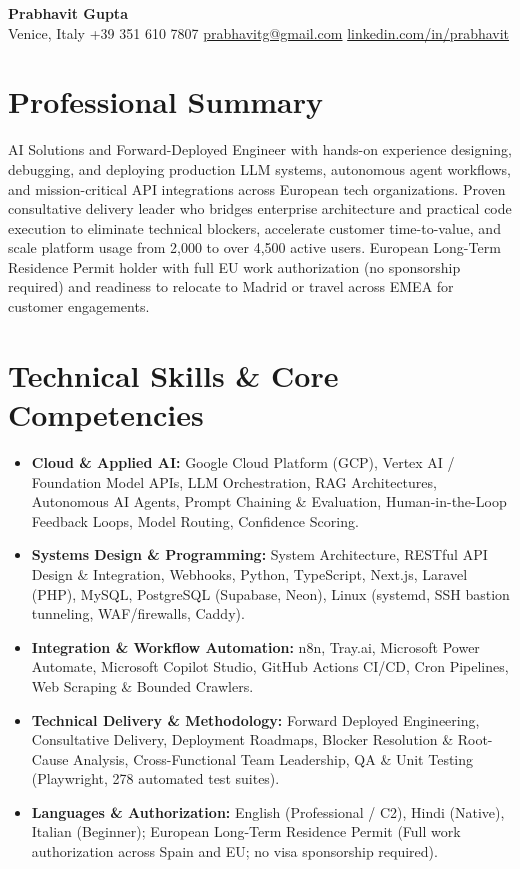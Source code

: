 \documentclass[10pt,a4paper]{article}
\begin{document}

\begin{center}
    {\LARGE \textbf{Prabhavit Gupta}}\\[4pt]
    Venice, Italy \textbar{} +39 351 610 7807 \textbar{} \href{mailto:prabhavitg@gmail.com}{prabhavitg@gmail.com} \textbar{} \href{https://www.linkedin.com/in/prabhavit}{linkedin.com/in/prabhavit}
\end{center}

\vspace{-2pt}

\section*{Professional Summary}
AI Solutions and Forward-Deployed Engineer with hands-on experience designing, debugging, and deploying production LLM systems, autonomous agent workflows, and mission-critical API integrations across European tech organizations. Proven consultative delivery leader who bridges enterprise architecture and practical code execution to eliminate technical blockers, accelerate customer time-to-value, and scale platform usage from 2,000 to over 4,500 active users. European Long-Term Residence Permit holder with full EU work authorization (no sponsorship required) and readiness to relocate to Madrid or travel across EMEA for customer engagements.

\section*{Technical Skills \& Core Competencies}
\begin{itemize}
    \item \textbf{Cloud \& Applied AI:} Google Cloud Platform (GCP), Vertex AI / Foundation Model APIs, LLM Orchestration, RAG Architectures, Autonomous AI Agents, Prompt Chaining \& Evaluation, Human-in-the-Loop Feedback Loops, Model Routing, Confidence Scoring.
    \item \textbf{Systems Design \& Programming:} System Architecture, RESTful API Design \& Integration, Webhooks, Python, TypeScript, Next.js, Laravel (PHP), MySQL, PostgreSQL (Supabase, Neon), Linux (systemd, SSH bastion tunneling, WAF/firewalls, Caddy).
    \item \textbf{Integration \& Workflow Automation:} n8n, Tray.ai, Microsoft Power Automate, Microsoft Copilot Studio, GitHub Actions CI/CD, Cron Pipelines, Web Scraping \& Bounded Crawlers.
    \item \textbf{Technical Delivery \& Methodology:} Forward Deployed Engineering, Consultative Delivery, Deployment Roadmaps, Blocker Resolution \& Root-Cause Analysis, Cross-Functional Team Leadership, QA \& Unit Testing (Playwright, 278 automated test suites).
    \item \textbf{Languages \& Authorization:} English (Professional / C2), Hindi (Native), Italian (Beginner); European Long-Term Residence Permit (Full work authorization across Spain and EU; no visa sponsorship required).
\end{itemize}
\end{document}
